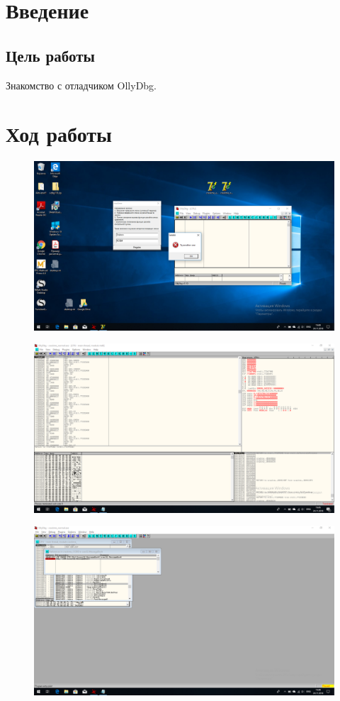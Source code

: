 \chapter{Введение}

\section{Цель работы}

Знакомство с отладчиком OllyDbg.


\chapter{Ход работы}

\begin{figure}
	\centering
	\includegraphics[width=.8\textwidth]{images/1.png}
\end{figure}

\begin{figure}
	\centering
	\includegraphics[width=.8\textwidth]{images/2.png}
\end{figure}

\begin{figure}
	\centering
	\includegraphics[width=.8\textwidth]{images/3.png}
\end{figure}

